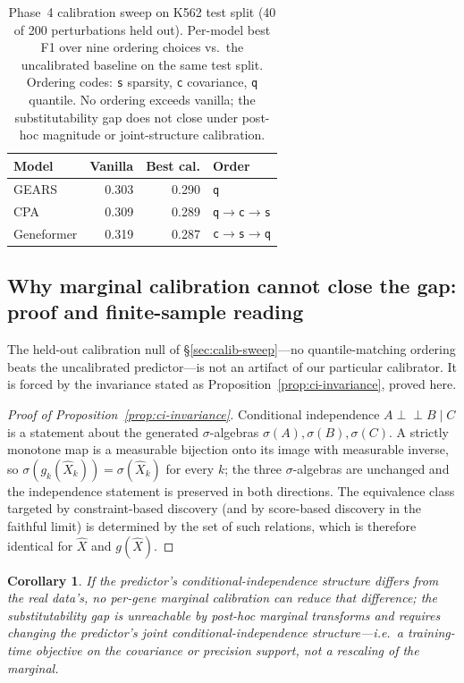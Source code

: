 \documentclass{article}
\theoremstyle{plain}
\newtheorem{corollary}[theorem]{Corollary}
\theoremstyle{definition}
\theoremstyle{remark}
\begin{document}
\begin{table}[h]
\centering
\small
\begin{tabular}{lrrl}
\toprule
\textbf{Model} & \textbf{Vanilla} & \textbf{Best cal.} & \textbf{Order} \\
\midrule
GEARS       & 0.303 & 0.290 & \texttt{q} \\
CPA         & 0.309 & 0.289 & \texttt{q$\to$c$\to$s} \\
Geneformer  & 0.319 & 0.287 & \texttt{c$\to$s$\to$q} \\
\bottomrule
\end{tabular}
\caption{Phase~4 calibration sweep on K562 test split (40 of 200 perturbations held out). Per-model best F1 over nine ordering choices vs.\ the uncalibrated baseline on the same test split. Ordering codes: \texttt{s} sparsity, \texttt{c} covariance, \texttt{q} quantile. No ordering exceeds vanilla; the substitutability gap does not close under post-hoc magnitude or joint-structure calibration.}
\label{tab:calib_sweep}
\end{table}

\subsection{Why marginal calibration cannot close the gap: proof and finite-sample reading}
\label{app:identifiability}
The held-out calibration null of \S\ref{sec:calib-sweep}---no quantile-matching ordering beats the uncalibrated predictor---is not an artifact of our particular calibrator. It is forced by the invariance stated as Proposition~\ref{prop:ci-invariance}, proved here.

\begin{proof}[Proof of Proposition~\ref{prop:ci-invariance}]
Conditional independence $A\perp\!\!\!\perp B\mid C$ is a statement about the generated $\sigma$-algebras $\sigma(A),\sigma(B),\sigma(C)$. A strictly monotone map is a measurable bijection onto its image with measurable inverse, so $\sigma(g_k(\hat X_k))=\sigma(\hat X_k)$ for every $k$; the three $\sigma$-algebras are unchanged and the independence statement is preserved in both directions. The equivalence class targeted by constraint-based discovery (and by score-based discovery in the faithful limit) is determined by the set of such relations, which is therefore identical for $\hat X$ and $g(\hat X)$.
\end{proof}

\begin{corollary}
\label{cor:calib-kernel}
If the predictor's conditional-independence structure differs from the real data's, no per-gene marginal calibration can reduce that difference; the substitutability gap is unreachable by post-hoc marginal transforms and requires changing the predictor's joint conditional-independence structure---i.e.\ a training-time objective on the covariance or precision support, not a rescaling of the marginal.
\end{corollary}
\end{document}
